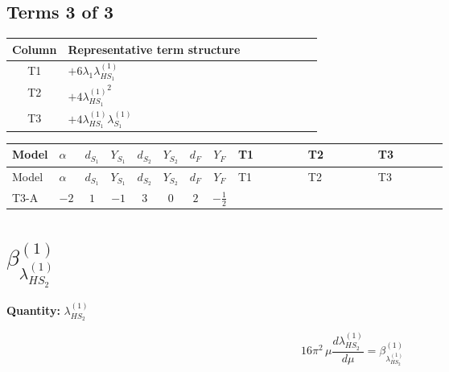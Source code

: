 \documentclass[8pt]{article}
\begin{document}
\begin{landscape}
\subsection*{Terms 3 of 3}
\begin{center}
\begin{tabular}{@{}c >{\raggedright\arraybackslash}p{0.82\linewidth}@{}}
\toprule
Column & Representative term structure \\
\midrule
T1 & \(\displaystyle +6 {\lambda_1} {\lambda_{HS_1}^{(1)}}\) \\
\midrule
T2 & \(\displaystyle +4 {\lambda_{HS_1}^{(1)}}^2\) \\
\midrule
T3 & \(\displaystyle +4 {\lambda_{HS_1}^{(1)}} {\lambda_{S_1}^{(1)}}\) \\
\midrule
\bottomrule
\end{tabular}
\end{center}
\smallskip
\tiny
\begin{longtable}{@{}llcccccc >{\raggedright\arraybackslash}p{0.21\linewidth} >{\raggedright\arraybackslash}p{0.21\linewidth} >{\raggedright\arraybackslash}p{0.21\linewidth}@{}}
\toprule
Model & $\alpha$ & $d_{S_1}$ & $Y_{S_1}$ & $d_{S_2}$ & $Y_{S_2}$ & $d_F$ & $Y_F$ & T1 & T2 & T3 \\
\midrule
\endfirsthead
\toprule
Model & $\alpha$ & $d_{S_1}$ & $Y_{S_1}$ & $d_{S_2}$ & $Y_{S_2}$ & $d_F$ & $Y_F$ & T1 & T2 & T3 \\
\midrule
\endhead
T3-A & $-2$ & $1$ & $-1$ & $3$ & $0$ & $2$ & $-\frac{1}{2}$ & \scriptsize\adjustbox{max width=\linewidth}{$\begin{gathered} +6 {\lambda_1} {\lambda_{HS_1}^{(1)}}\end{gathered}$} & \scriptsize\adjustbox{max width=\linewidth}{$\begin{gathered} +4 {\lambda_{HS_1}^{(1)}}^2\end{gathered}$} & \scriptsize\adjustbox{max width=\linewidth}{$\begin{gathered} +4 {\lambda_{HS_1}^{(1)}} {\lambda_{S_1}^{(1)}}\end{gathered}$} \\
\midrule
\bottomrule
\end{longtable}
\clearpage
\section*{$\beta_{\lambda_{HS_2}^{(1)}}^{(1)}$}
\noindent\textbf{Quantity: }$\lambda_{HS_2}^{(1)}$\par\smallskip
\[16\pi^2\,\mu\frac{d \lambda_{HS_2}^{(1)}}{d\mu}=\beta_{\lambda_{HS_2}^{(1)}}^{(1)}\]

\end{landscape}
\end{document}
